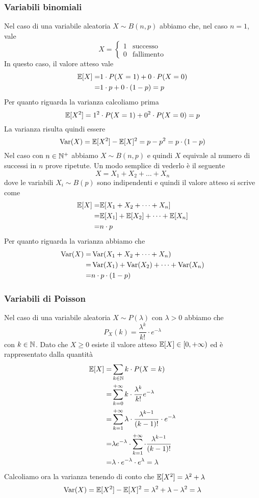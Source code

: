 \subsubsection{Variabili binomiali}
Nel caso di una variabile aleatoria $X \sim B(n,p)$ abbiamo che, nel caso $n=1$, vale
\[
	X = \begin{cases}
		1 & \text{successo}   \\
		0 & \text{fallimento}
	\end{cases}
\]
In questo caso, il valore atteso vale
\begin{align*}
	\mathbb{E}[X] = & 1 \cdot P(X = 1) + 0 \cdot P(X = 0) \\
	=       & 1 \cdot p + 0 \cdot (1-p) = p
\end{align*}
Per quanto riguarda la varianza calcoliamo prima
\[ \mathbb{E}[X^2] = 1^2 \cdot P(X=1) + 0^2 \cdot P(X = 0) = p \]
La varianza risulta quindi essere
\[ \operatorname{Var}(X) = \mathbb{E}[X^2] - \mathbb{E}[X]^2 = p - p^2 = p \cdot (1-p) \]
Nel caso con $n \in \mathbb{N}^+$ abbiamo $X \sim B(n,p)$ e quindi $X$ equivale al numero di successi in
$n$ prove ripetute. Un modo semplice di vederlo è il seguente
\[ X = X_1 + X_2 + \dots + X_n \]
dove le variabili $X_i \sim B(p)$ sono indipendenti e quindi il valore atteso si scrive come
\begin{align*}
	\mathbb{E}[X] = & \mathbb{E}[X_1 + X_2 + \dots + X_n]         \\
	=       & \mathbb{E}[X_1] + \mathbb{E}[X_2] + \dots + \mathbb{E}[X_n] \\
	=       & n \cdot p
\end{align*}
Per quanto riguarda la varianza abbiamo che
\begin{align*}
	\operatorname{Var}(X) = & \operatorname{Var}(X_1 + X_2 + \dots + X_n)             \\
	=         & \operatorname{Var}(X_1) + \operatorname{Var}(X_2) + \dots + \operatorname{Var}(X_n) \\
	=         & n \cdot p \cdot (1-p)
\end{align*}

\subsubsection{Variabili di Poisson}
Nel caso di una variabile aleatoria $X \sim P(\lambda)$ con $\lambda > 0$ abbiamo che
\[ P_X (k) = \frac{\lambda^k}{k!} \cdot e^{-\lambda} \]
con $k \in \mathbb{N}$. Dato che $X \geq 0$ esiste il valore atteso $\mathbb{E}[X] \in [0, +\infty)$ ed è
rappresentato dalla quantità
\begin{align*}
	\mathbb{E}[X] = & \sum_{k \in \mathbb{N}} k \cdot P(X = k)                                                   \\
	=       & \sum_{k=0}^{+\infty} k \cdot \frac{\lambda^k}{k!} e^{-\lambda}                     \\
	=       & \sum_{k=1}^{+\infty} \lambda \cdot \frac{\lambda^{k-1}}{(k-1)!} \cdot e^{-\lambda} \\
	=       & \lambda e^{-\lambda} \cdot \sum_{k=1}^{+\infty} \cdot \frac{\lambda^{k-1}}{(k-1)!} \\
	=       & \lambda \cdot e^{-\lambda} \cdot e^\lambda = \lambda
\end{align*}
Calcoliamo ora la varianza tenendo di conto che $\mathbb{E}[X^2] = \lambda^2 + \lambda$
\[ \operatorname{Var}(X) = \mathbb{E}[X^2] - \mathbb{E}[X]^2 = \lambda^2 + \lambda - \lambda^2 = \lambda \]

